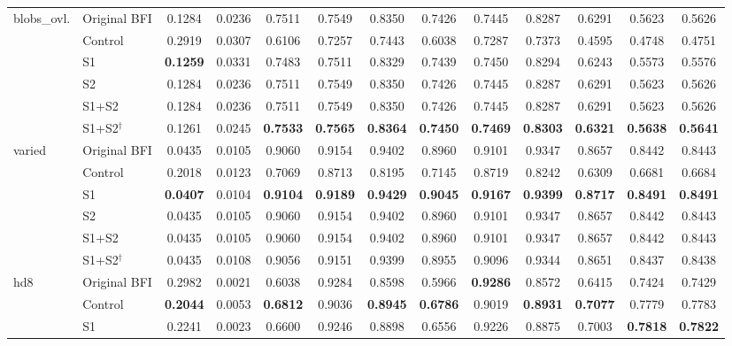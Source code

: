 \begin{table}[!t]
\begin{tabular}{llccccccccccc}
\midrule
\multirow{6}{*}{blobs\_ovl.} & Original BFI & 0.1284 & 0.0236 & 0.7511 & 0.7549 & 0.8350 & 0.7426 & 0.7445 & 0.8287 & 0.6291 & 0.5623 & 0.5626 \\
 & Control & 0.2919 & 0.0307 & 0.6106 & 0.7257 & 0.7443 & 0.6038 & 0.7287 & 0.7373 & 0.4595 & 0.4748 & 0.4751 \\
 & S1 & \textbf{0.1259} & 0.0331 & 0.7483 & 0.7511 & 0.8329 & 0.7439 & 0.7450 & 0.8294 & 0.6243 & 0.5573 & 0.5576 \\
 & S2 & 0.1284 & 0.0236 & 0.7511 & 0.7549 & 0.8350 & 0.7426 & 0.7445 & 0.8287 & 0.6291 & 0.5623 & 0.5626 \\
 & S1+S2 & 0.1284 & 0.0236 & 0.7511 & 0.7549 & 0.8350 & 0.7426 & 0.7445 & 0.8287 & 0.6291 & 0.5623 & 0.5626 \\
 & S1+S2$^{\dagger}$ & 0.1261 & 0.0245 & \textbf{0.7533} & \textbf{0.7565} & \textbf{0.8364} & \textbf{0.7450} & \textbf{0.7469} & \textbf{0.8303} & \textbf{0.6321} & \textbf{0.5638} & \textbf{0.5641} \\
\midrule
\multirow{6}{*}{varied} & Original BFI & 0.0435 & 0.0105 & 0.9060 & 0.9154 & 0.9402 & 0.8960 & 0.9101 & 0.9347 & 0.8657 & 0.8442 & 0.8443 \\
 & Control & 0.2018 & 0.0123 & 0.7069 & 0.8713 & 0.8195 & 0.7145 & 0.8719 & 0.8242 & 0.6309 & 0.6681 & 0.6684 \\
 & S1 & \textbf{0.0407} & 0.0104 & \textbf{0.9104} & \textbf{0.9189} & \textbf{0.9429} & \textbf{0.9045} & \textbf{0.9167} & \textbf{0.9399} & \textbf{0.8717} & \textbf{0.8491} & \textbf{0.8491} \\
 & S2 & 0.0435 & 0.0105 & 0.9060 & 0.9154 & 0.9402 & 0.8960 & 0.9101 & 0.9347 & 0.8657 & 0.8442 & 0.8443 \\
 & S1+S2 & 0.0435 & 0.0105 & 0.9060 & 0.9154 & 0.9402 & 0.8960 & 0.9101 & 0.9347 & 0.8657 & 0.8442 & 0.8443 \\
 & S1+S2$^{\dagger}$ & 0.0435 & 0.0108 & 0.9056 & 0.9151 & 0.9399 & 0.8955 & 0.9096 & 0.9344 & 0.8651 & 0.8437 & 0.8438 \\
\midrule
\multirow{6}{*}{hd8} & Original BFI & 0.2982 & 0.0021 & 0.6038 & 0.9284 & 0.8598 & 0.5966 & \textbf{0.9286} & 0.8572 & 0.6415 & 0.7424 & 0.7429 \\
 & Control & \textbf{0.2044} & 0.0053 & \textbf{0.6812} & 0.9036 & \textbf{0.8945} & \textbf{0.6786} & 0.9019 & \textbf{0.8931} & \textbf{0.7077} & 0.7779 & 0.7783 \\
 & S1 & 0.2241 & 0.0023 & 0.6600 & 0.9246 & 0.8898 & 0.6556 & 0.9226 & 0.8875 & 0.7003 & \textbf{0.7818} & \textbf{0.7822} \\

\end{tabular}
\end{table}
